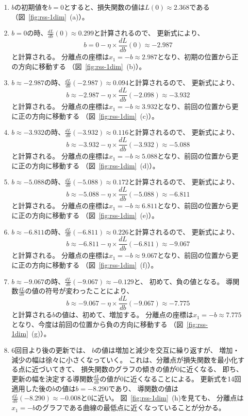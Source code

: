 \begin{enumerate}\renewcommand\labelenumi{\textbf{ステップ\arabic{enumi}. }}
\item
  $b$の初期値を$b = 0$とすると、損失関数の値は$L(0) \approx 2.368$である
  （図~\ref{fig:rss-1dim}~(a)）。
\item  
  $b = 0$の時、$\frac{dL}{db}(0) \approx 0.299$と計算されるので、
  更新式により、
  \[
    b = 0 - \eta \times \frac{dL}{db}(0) \approx - 2.987
  \]
  と計算される。
  分離点の座標は$x_1 = -b \approx 2.987$となり、初期の位置から正の方向に移動する
  （図~\ref{fig:rss-1dim}~(b)）。  
\item
  $b \approx -2.987$の時、$\frac{dL}{db}(-2.987) \approx 0.094$と計算されるので、
  更新式により、
  \[
    b \approx -2.987 - \eta \times \frac{dL}{db}(-2.098) \approx - 3.932
  \]
  と計算される。
  分離点の座標は$x_1 = -b \approx 3.932$となり、前回の位置から更に正の方向に移動する
  （図~\ref{fig:rss-1dim}~(c)）。  
\item
  $b \approx -3.932$の時、$\frac{dL}{db}(-3.932) \approx 0.116$と計算されるので、
  更新式により、
  \[
    b \approx -3.932 - \eta \times \frac{dL}{db}(-3.932) \approx - 5.088
  \]
  と計算される。
  分離点の座標は$x_1 = -b \approx 5.088$となり、前回の位置から更に正の方向に移動する
  （図~\ref{fig:rss-1dim}~(d)）。  
\item
  $b \approx -5.088$の時、$\frac{dL}{db}(-5.088) \approx 0.172$と計算されるので、
  更新式により、
  \[
    b \approx -5.088 - \eta \times \frac{dL}{db}(-5.088) \approx - 6.811
  \]
  と計算される。
  分離点の座標は$x_1 = -b \approx 6.811$となり、前回の位置から更に正の方向に移動する
  （図~\ref{fig:rss-1dim}~(e)）。  
\item
  $b \approx -6.811$の時、$\frac{dL}{db}(-6.811) \approx 0.226$と計算されるので、
  更新式により、
  \[
    b \approx -6.811 - \eta \times \frac{dL}{db}(-6.811) \approx - 9.067
  \]
  と計算される。
  分離点の座標は$x_1 = -b \approx 9.067$となり、前回の位置から更に正の方向に移動する
  （図~\ref{fig:rss-1dim}~(f)）。  
\item
  $b \approx -9.067$の時、$\frac{dL}{db}(-9.067) \approx -0.129$と、
  初めて、負の値となる。
  導関数$\frac{dL}{db}$の値の符号が変わったことにより、
  \[
    b \approx -9.067 - \eta \times \frac{dL}{db}(-9.067) \approx - 7.775
  \]
  と計算される$b$の値は、初めて、増加する。
  分離点の座標は$x_1 = -b \approx 7.775$となり、今度は前回の位置から負の方向に移動する
  （図~\ref{fig:rss-1dim}~(g)）。  
\item
  6回目より後の更新では、
  $b$の値は増加と減少を交互に繰り返すが、
  増加・減少の幅は徐々に小さくなっていく。
  これは、分離点が損失関数を最小化する点に近づいてきて、
  損失関数のグラフの傾きの値が0に近くなる、
  即ち、更新の幅を決定する導関数$\frac{dL}{db}$の値が0に近くなることによる。
  更新式を14回適用した後の$b$の値は$b = - 8.290$であり、
  導関数の値は  $\frac{dL}{db}(- 8.290) \approx -0.008$と0に近い。
  図~\ref{fig:rss-1dim}~(h)を見ても、
  分離点は$x_1 = -b$のグラフである曲線の最低点に近くなっていることが分かる。
\end{enumerate}

